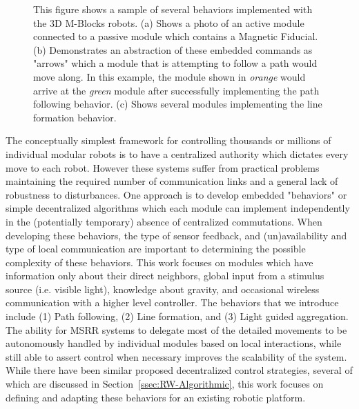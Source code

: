 \begin{figure}[t]
\begin{subfigure}[b]{\linewidth}
	\end{subfigure}
	
	
	\caption{This figure shows a sample of several behaviors implemented with the 3D M-Blocks robots. (a) Shows a photo of an active module connected to a passive module which contains a Magnetic Fiducial. (b) Demonstrates an abstraction of these embedded commands as "arrows" which a module that is attempting to follow a path would move along. In this example, the module shown in \emph{orange} would arrive at the \emph{green} module after successfully implementing the path following behavior. (c) Shows several modules implementing the line formation behavior.}
	
	\label{fig:intro}
\end{figure}

The conceptually simplest framework for controlling thousands or millions of individual modular robots is to have a centralized authority which dictates every move to each robot. However these systems suffer from practical problems maintaining the required number of communication links and a general lack of robustness to disturbances. One approach is to develop embedded "behaviors" or simple decentralized algorithms which each module can implement independently in the (potentially temporary) absence of centralized commutations. When developing these behaviors, the type of sensor feedback, and (un)availability and type of local communication are important to determining the possible complexity of these behaviors. This work focuses on modules which have information only about their direct neighbors, global input from a stimulus source (i.e. visible light), knowledge about gravity, and occasional wireless communication with a higher level controller. The behaviors that we introduce include (1) Path following, (2) Line formation, and (3) Light guided aggregation. The ability for MSRR systems to delegate most of the detailed movements to be autonomously handled by individual modules based on local interactions, while still able to assert control when necessary improves the scalability of the system. While there have been similar proposed decentralized control strategies, several of which are discussed in Section~\ref{ssec:RW-Algorithmic}, this work focuses on defining and adapting these behaviors for an existing robotic platform.

